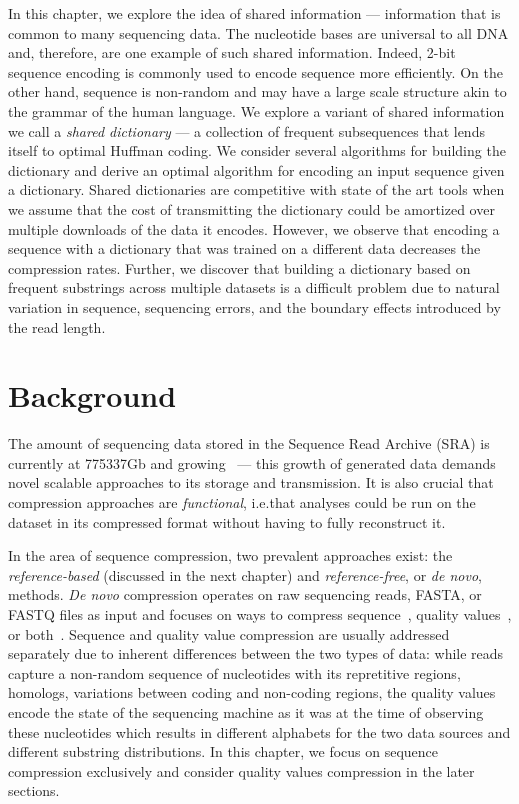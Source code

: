 \documentclass[12pt]{cmuthesis}
\begin{document}
In this chapter, we explore the idea of shared information --- information that is common to many sequencing data. The nucleotide bases are universal to all DNA and, therefore, are one example of such shared information. Indeed, 2-bit sequence encoding is commonly used to encode sequence more efficiently. On the other hand, sequence is non-random and may have a large scale structure akin to the grammar of the human language. We explore a variant of shared information we call a \textit{shared dictionary} --- a collection of frequent subsequences that lends itself to optimal Huffman coding. We consider several algorithms for building the dictionary and derive an optimal algorithm for encoding an input sequence given a dictionary. Shared dictionaries are competitive with state of the art tools when we assume that the cost of transmitting the dictionary could be amortized over multiple downloads of the data it encodes. However, we observe that encoding a sequence with a dictionary that was trained on a different data decreases the compression rates. Further, we discover that building a dictionary based on frequent substrings across multiple datasets is a difficult problem due to natural variation in sequence, sequencing errors, and the boundary effects introduced by the read length.


\section{Background}


The amount of sequencing data stored in the Sequence Read Archive (SRA) is currently at 775337Gb and growing~\cite{SRA} --- this growth of generated data demands novel scalable approaches to its storage and transmission. It is also crucial that compression approaches are \textit{functional}, i.e.\@ that analyses could be run on the dataset in its compressed format without having to fully reconstruct it. 


In the area of sequence compression, two prevalent approaches exist: the \textit{reference-based} (discussed in the next chapter) and \textit{reference-free}, or \textit{de novo}, methods. \textit{De novo} compression operates on raw sequencing reads, FASTA, or FASTQ files as input and focuses on ways to compress sequence~\cite{Mince,PathEncode,Rozov2014}, quality values~\cite{SeqSqueeze,KmerQuals,JaninQuals}, or both~\cite{GSQZ,Sahinalp2012}. 
Sequence and quality value compression are usually addressed separately due to inherent differences between the two types of data: while reads capture a non-random sequence of nucleotides with its repretitive regions, homologs, variations between coding and non-coding regions, the quality values encode the state of the sequencing machine as it was at the time of observing these nucleotides which results in different alphabets for the two data sources and different substring distributions. In this chapter, we focus on sequence compression exclusively and consider quality values compression in the later sections.
\end{document}
